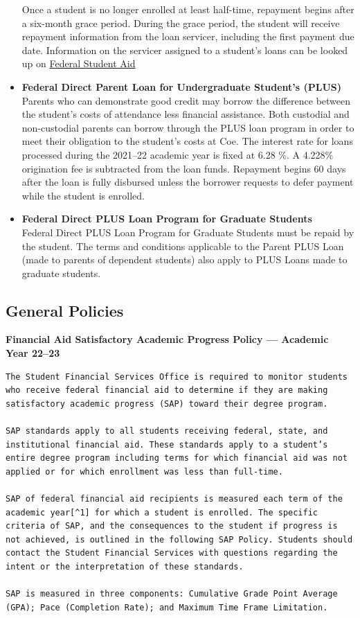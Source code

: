 \documentclass[
  letterpaper,
]{scrbook}
\begin{document}
\begin{itemize}
  Once a student is no longer enrolled at least half-time, repayment
  begins after a six-month grace period. During the grace period, the
  student will receive repayment information from the loan servicer,
  including the first payment due date. Information on the servicer
  assigned to a student's loans can be looked up on
  \href{studentaid.gov.}{Federal Student Aid}
\item
  \textbf{Federal Direct Parent Loan for Undergraduate Student's (PLUS)}
  Parents who can demonstrate good credit may borrow the difference
  between the student's costs of attendance less financial assistance.
  Both custodial and non-custodial parents can borrow through the PLUS
  loan program in order to meet their obligation to the student's costs
  at Coe. The interest rate for loans processed during the 2021--22
  academic year is fixed at 6.28 \%. A 4.228\% origination fee is
  subtracted from the loan funds. Repayment begins 60 days after the
  loan is fully disbursed unless the borrower requests to defer payment
  while the student is enrolled.
\item
  \textbf{Federal Direct PLUS Loan Program for Graduate Students}\\
  Federal Direct PLUS Loan Program for Graduate Students must be repaid
  by the student. The terms and conditions applicable to the Parent PLUS
  Loan (made to parents of dependent students) also apply to PLUS Loans
  made to graduate students.
\end{itemize}

\subsection{General
Policies}\label{sec-financial-aid-satisfactory-academic-prgress-policy}

\textbf{Financial Aid Satisfactory Academic Progress Policy --- Academic
Year 22--23}

\begin{verbatim}
The Student Financial Services Office is required to monitor students who receive federal financial aid to determine if they are making satisfactory academic progress (SAP) toward their degree program.

SAP standards apply to all students receiving federal, state, and institutional financial aid. These standards apply to a student’s entire degree program including terms for which financial aid was not applied or for which enrollment was less than full-time.  

SAP of federal financial aid recipients is measured each term of the academic year[^1] for which a student is enrolled. The specific criteria of SAP, and the consequences to the student if progress is not achieved, is outlined in the following SAP Policy. Students should contact the Student Financial Services with questions regarding the intent or the interpretation of these standards.

SAP is measured in three components: Cumulative Grade Point Average (GPA); Pace (Completion Rate); and Maximum Time Frame Limitation.
\end{verbatim}
\end{document}
